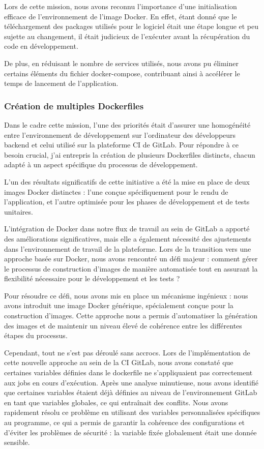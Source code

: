 Lors de cette mission, nous avons reconnu l'importance d'une initialisation efficace de l'environnement de l'image Docker.
En effet, étant donné que le téléchargement des packages utilisés pour le logiciel était une étape longue et peu sujette au changement, il était judicieux de l'exécuter avant la récupération du code en développement.

De plus, en réduisant le nombre de services utilisés, nous avons pu éliminer certains éléments du fichier docker-compose, contribuant ainsi à accélérer le temps de lancement de l'application.

\subsubsection{Création de multiples Dockerfiles}
Dans le cadre cette mission, l'une des priorités était d'assurer une homogénéité entre l'environnement de développement sur l'ordinateur des développeurs backend et celui utilisé sur la plateforme CI de GitLab.
Pour répondre à ce besoin crucial, j'ai entrepris la création de plusieurs Dockerfiles distincts, chacun adapté à un aspect spécifique du processus de développement.

L'un des résultats significatifs de cette initiative a été la mise en place de deux images Docker distinctes : l'une conçue spécifiquement pour le rendu de l'application, et l'autre optimisée pour les phases de développement et de tests unitaires.

L'intégration de Docker dans notre flux de travail au sein de GitLab a apporté des améliorations significatives, mais elle a également nécessité des ajustements dans l'environnement de travail de la plateforme.
Lors de la transition vers une approche basée sur Docker, nous avons rencontré un défi majeur : comment gérer le processus de construction d'images de manière automatisée tout en assurant la flexibilité nécessaire pour le développement et les tests ?

Pour résoudre ce défi, nous avons mis en place un mécanisme ingénieux : nous avons introduit une image Docker générique, spécialement conçue pour la construction d'images.
Cette approche nous a permis d'automatiser la génération des images et de maintenir un niveau élevé de cohérence entre les différentes étapes du processus.

Cependant, tout ne s'est pas déroulé sans accrocs.
Lors de l'implémentation de cette nouvelle approche au sein de la CI GitLab, nous avons constaté que certaines variables définies dans le dockerfile ne s'appliquaient pas correctement aux jobs en cours d'exécution.
Après une analyse minutieuse, nous avons identifié que certaines variables étaient déjà définies au niveau de l'environnement GitLab en tant que variables globales, ce qui entraînait des conflits.
Nous avons rapidement résolu ce problème en utilisant des variables personnalisées spécifiques au programme, ce qui a permis de garantir la cohérence des configurations et d'éviter les problèmes de sécurité : la variable fixée globalement était une donnée sensible.

